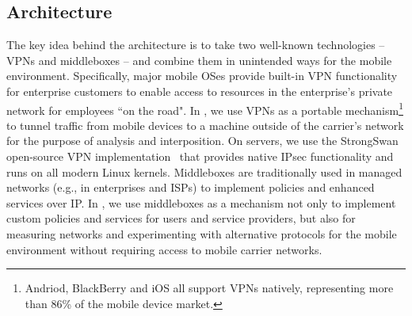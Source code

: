  
 \subsection{Architecture}
 The key idea behind the \meddle architecture is to take two
 well-known technologies -- VPNs and middleboxes -- and combine them
 in unintended ways for the mobile environment. Specifically, major
 mobile OSes provide built-in VPN functionality for enterprise
 customers to enable access to resources in
 the enterprise's private network for employees ``on the road". 
In \meddle, we use VPNs as a portable mechanism\footnote{Andriod, BlackBerry and iOS all support VPNs natively, representing more than 86\% of the mobile device market\cite{gartner-phone-share}.} to tunnel traffic from mobile devices to a machine outside of the carrier's network for the purpose of analysis and interposition. On \meddle servers, we use the StrongSwan 
 open-source VPN implementation~\cite{strongswan} that provides native IPsec 
 functionality and runs on all modern Linux kernels.
 Middleboxes are traditionally used in managed networks (e.g., in enterprises and ISPs) to implement policies and enhanced services over IP. In \meddle, we use middleboxes as a mechanism not only to implement custom policies and services for users and service providers, but also for measuring networks and experimenting with alternative protocols for the mobile environment without requiring access to mobile carrier networks. 

